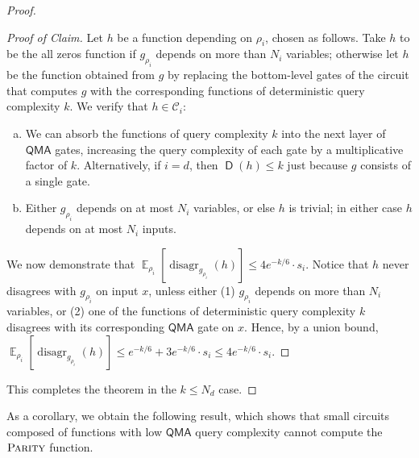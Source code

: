 \documentclass[10pt,a4paper]{article}
\newcommand{\E}{\mathop{\mathbb{E}}}
\newcommand{\PARITY}{\normalfont\textsc{Parity}}
\DeclareMathOperator{\disagr}{\mathrm{disagr}}
\DeclareMathOperator{\D}{\mathsf{D}}
\begin{document}
\begin{proof}
\begin{proof}[Proof of Claim]
Let $h$ be a function depending on $\rho_i$, chosen as follows. Take $h$ to be the all zeros function if $g_{\rho_i}$ depends on more than $N_i$ variables; otherwise let $h$ be the function obtained from $g$ by replacing the bottom-level gates of the circuit that computes $g$ with the corresponding functions of deterministic query complexity $k$. We verify that $h \in \mathcal{C}_i$:
\begin{enumerate}[(a)]
\item We can absorb the functions of query complexity $k$ into the next layer of $\mathsf{QMA}$ gates, increasing the query complexity of each gate by a multiplicative factor of $k$. Alternatively, if $i = d$, then $\D(h) \le k$ just because $g$ consists of a single gate.
\item Either $g_{\rho_i}$ depends on at most $N_i$ variables, or else $h$ is trivial; in either case $h$ depends on at most $N_i$ inputs.
\end{enumerate}
We now demonstrate that $\E_{\rho_i}\left[\disagr_{g_{\rho_i}}(h)\right] \le 4e^{-k/6} \cdot s_i$. Notice that $h$ never disagrees with $g_{\rho_i}$ on input $x$, unless either (1) $g_{\rho_i}$ depends on more than $N_i$ variables, or (2) one of the functions of deterministic query complexity $k$ disagrees with its corresponding $\mathsf{QMA}$ gate on $x$. Hence, by a union bound, $\E_{\rho_i}\left[\disagr_{g_{\rho_i}}(h)\right] \le e^{-k/6} + 3e^{-k/6} \cdot s_i \le 4e^{-k/6} \cdot s_i$.
\end{proof}
This completes the theorem in the $k \le N_d$ case.
\end{proof}

As a corollary, we obtain the following result, which shows that small circuits composed of functions with low $\mathsf{QMA}$ query complexity cannot compute the $\PARITY$ function.
\end{document}
